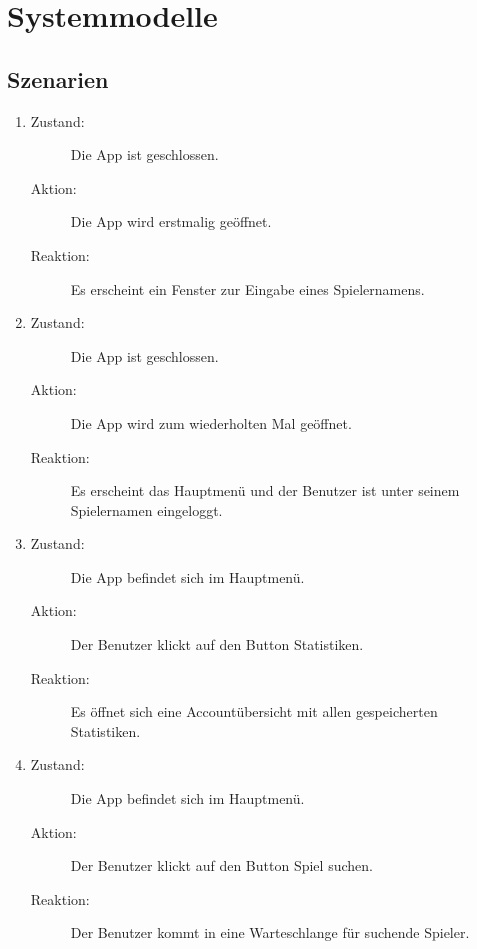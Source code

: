 \documentclass[parskip=full]{scrartcl}
\begin{document}
\section{Systemmodelle}
\subsection{Szenarien}
\begin{enumerate}
 
    \item
	\begin{description}
	\item[Zustand:] Die App ist geschlossen.
	\item[Aktion:] Die App wird erstmalig geöffnet.
	\item[Reaktion:] Es erscheint ein Fenster zur Eingabe eines Spielernamens.  \\	
	\end{description}
	
	\item
	\begin{description}
	\item[Zustand:] Die App ist geschlossen.
	\item[Aktion:] Die App wird zum wiederholten Mal geöffnet.
	\item[Reaktion:] Es erscheint das Hauptmenü und der Benutzer ist unter seinem Spielernamen eingeloggt. \\
	\end{description}
	
	\item
	\begin{description}
	\item[Zustand:] Die App befindet sich im Hauptmenü.
	\item[Aktion:] Der Benutzer klickt auf den Button \glqq Statistiken\grqq.
	\item[Reaktion:] Es öffnet sich eine Accountübersicht mit allen gespeicherten Statistiken.  \\
	\end{description}
	
	\item
	\begin{description}
	\item[Zustand:] Die App befindet sich im Hauptmenü.
	\item[Aktion:] Der Benutzer klickt auf den Button \glqq Spiel suchen\grqq.
	\item[Reaktion:] Der Benutzer kommt in eine Warteschlange für suchende Spieler.  \\
	\end{description}
	

\end{enumerate}
\end{document}
